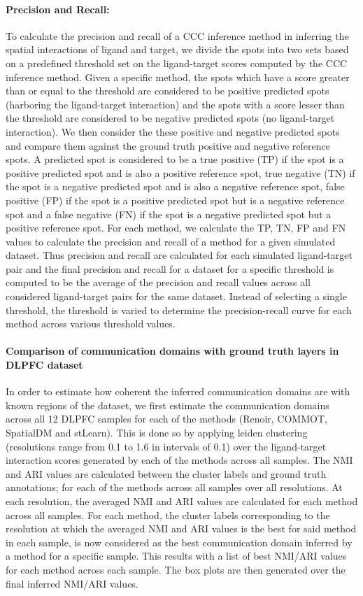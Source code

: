 \paragraph{Precision and Recall:} To calculate the precision and recall of a CCC inference method in inferring the spatial interactions of ligand and target, we divide the spots into two sets based on a predefined threshold set on the ligand-target scores computed by the CCC inference method. Given a specific method, the spots which have a score greater than or equal to the threshold are considered to be positive predicted spots (harboring the ligand-target interaction) and the spots with a score lesser than the threshold are considered to be negative predicted spots (no ligand-target interaction). We then consider the these positive and negative predicted spots and compare them against the ground truth positive and negative reference spots. A predicted spot is considered to be a true positive (TP) if the spot is a positive predicted spot and is also a positive reference spot, true negative (TN) if the spot is a negative predicted spot and is also a negative reference spot, false positive (FP) if the spot is a positive predicted spot but is a negative reference spot and a false negative (FN) if the spot is a negative predicted spot but a positive reference spot. For each method, we calculate the TP, TN, FP and FN values to calculate the precision and recall of a method for a given simulated dataset. Thus precision and recall are calculated for each simulated ligand-target pair and the final precision and recall for a dataset for a specific threshold is computed to be the average of the precision and recall values across all considered ligand-target pairs for the same dataset. Instead of selecting a single threshold, the threshold is varied to determine the precision-recall curve for each method across various threshold values. 

\paragraph{Comparison of communication domains with ground truth layers in DLPFC dataset}
In order to estimate how coherent the inferred communication domains are with known regions of the dataset, we first estimate the communication domains across all 12 DLPFC samples for each of the methods (Renoir, COMMOT, SpatialDM and stLearn). This is done so by applying leiden clustering (resolutions range from 0.1 to 1.6 in intervals of 0.1) over the ligand-target interaction scores generated by each of the methods across all samples. The NMI and ARI values are calculated between the cluster labels and ground truth annotations; for each of the methods across all samples over all resolutions. At each resolution, the averaged NMI and ARI values are calculated for each method across all samples. For each method, the cluster labels corresponding to the resolution at which the averaged NMI and ARI values is the best for said method in each sample, is now considered as the best communication domain inferred by a method for a specific sample. This results with a list of best NMI/ARI values for each method across each sample. The box plots are then generated over the final inferred NMI/ARI values.

